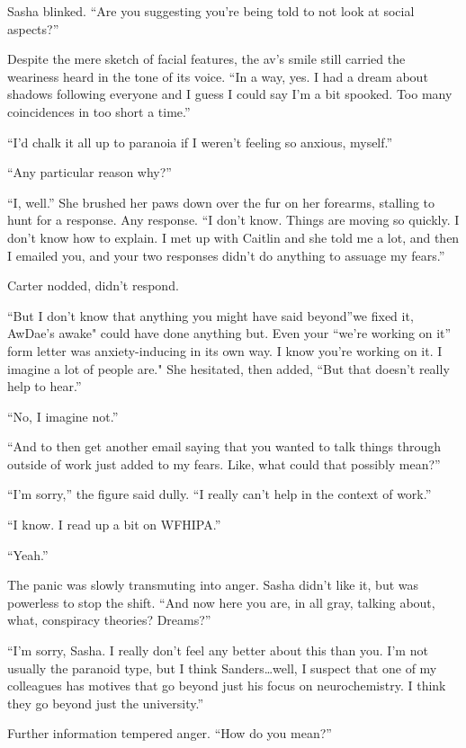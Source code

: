 Sasha blinked. ``Are you suggesting you're being told to not look at social aspects?''

Despite the mere sketch of facial features, the av's smile still carried the weariness heard in the tone of its voice. ``In a way, yes. I had a dream about shadows following everyone and I guess I could say I'm a bit spooked. Too many coincidences in too short a time.''

``I'd chalk it all up to paranoia if I weren't feeling so anxious, myself.''

``Any particular reason why?''

``I, well.'' She brushed her paws down over the fur on her forearms, stalling to hunt for a response. Any response. ``I don't know. Things are moving so quickly. I don't know how to explain. I met up with Caitlin and she told me a lot, and then I emailed you, and your two responses didn't do anything to assuage my fears.''

Carter nodded, didn't respond.

``But I don't know that anything you might have said beyond''we fixed it, AwDae's awake" could have done anything but. Even your ``we're working on it'' form letter was anxiety-inducing in its own way. I know you're working on it. I imagine a lot of people are." She hesitated, then added, ``But that doesn't really help to hear.''

``No, I imagine not.''

``And to then get another email saying that you wanted to talk things through outside of work just added to my fears. Like, what could that possibly mean?''

``I'm sorry,'' the figure said dully. ``I really can't help in the context of work.''

``I know. I read up a bit on WFHIPA.''

``Yeah.''

The panic was slowly transmuting into anger. Sasha didn't like it, but was powerless to stop the shift. ``And now here you are, in all gray, talking about, what, conspiracy theories? Dreams?''

``I'm sorry, Sasha. I really don't feel any better about this than you. I'm not usually the paranoid type, but I think Sanders\ldots{}well, I suspect that one of my colleagues has motives that go beyond just his focus on neurochemistry. I think they go beyond just the university.''

Further information tempered anger. ``How do you mean?''


